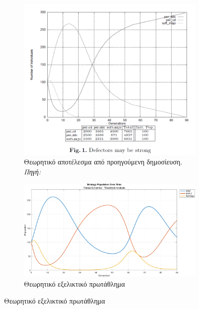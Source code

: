 \documentclass[12pt]{report}
\begin{document}
\begin{figure}[htbp]
    \centering

    \begin{subfigure}[b]{0.5\linewidth}
        \centering
        \includegraphics[width=\linewidth]{Figures Fitness Dynamics/1.png}
        \caption{Θεωρητικό αποτέλεσμα από προηγούμενη δημοσίευση. \textit{Πηγή:} \protect\cite{mathieu1999}}
        \label{fig:fig_fit_1_a}
    \end{subfigure}
    \hfill
    \begin{subfigure}[b]{0.5\linewidth}
        \centering
        \includegraphics[width=\linewidth]{Figures Fitness Dynamics/example1.png}
        \caption{Θεωρητικό εξελικτικό πρωτάθλημα}
        \label{fig:fig_fit_1_b}
    \end{subfigure}

\end{figure}
\end{document}
